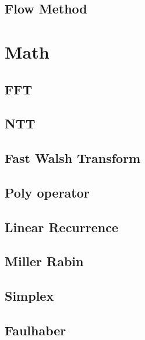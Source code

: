 \documentclass[a4paper,10pt,twocolumn,oneside]{article}
\begin{document}
\subsection{Flow Method}


\section{Math}
\subsection{FFT}


\subsection{NTT}


\subsection{Fast Walsh Transform}


\subsection{Poly operator}


%

\subsection{Linear Recurrence}


\subsection{Miller Rabin}


\subsection{Simplex}


\subsection{Faulhaber}

\end{document}
